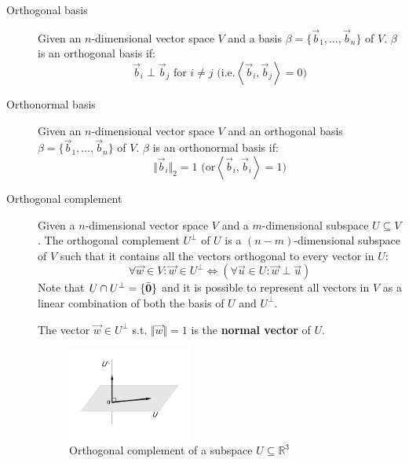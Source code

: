 \begin{description}
    \item[Orthogonal basis] 
        Given an $n$-dimensional vector space $V$ and a basis $\beta = \{ \vec{b}_1, \dots, \vec{b}_n \}$ of $V$.
        $\beta$ is an orthogonal basis if:
        \[ \vec{b}_i \perp \vec{b}_j \text{ for } i \neq j \text{ (i.e.} \left\langle \vec{b}_i, \vec{b}_j \right\rangle = 0 \text{)} \]

    \item[Orthonormal basis] 
        Given an $n$-dimensional vector space $V$ and an orthogonal basis $\beta = \{ \vec{b}_1, \dots, \vec{b}_n \}$ of $V$.
        $\beta$ is an orthonormal basis if:
        \[ \Vert \vec{b}_i \Vert_2 = 1 \text{ (or} \left\langle \vec{b}_i, \vec{b}_i \right\rangle = 1 \text{)} \]
    
    \item[Orthogonal complement] 
        Given a $n$-dimensional vector space $V$ and a $m$-dimensional subspace $U \subseteq V$.
        The orthogonal complement $U^\perp$ of $U$ is a $(n-m)$-dimensional subspace of $V$ such that it
        contains all the vectors orthogonal to every vector in $U$:
        \[ \forall \vec{w} \in V: \vec{w} \in U^\perp \iff (\forall \vec{u} \in U: \vec{w} \perp \vec{u}) \]
        Note that $U \cap U^\perp = \{ \bar{{\bm{0}}} \}$ and 
        it is possible to represent all vectors in $V$ as a linear combination of both the basis of $U$ and $U^\perp$.
        
        The vector $\vec{w} \in U^\perp$ s.t. $\Vert \vec{w} \Vert = 1$ is the \textbf{normal vector} of $U$. 
        \begin{figure}[h]
            \centering
            \includegraphics[width=0.4\textwidth]{img/_orthogonal_complement.pdf}
            \caption{Orthogonal complement of a subspace $U \subseteq \mathbb{R}^3$}
        \end{figure}
\end{description}




